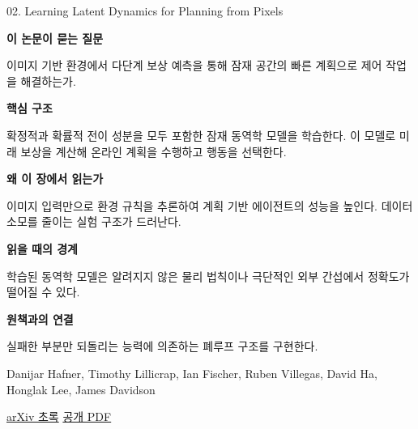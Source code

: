 \documentclass[11pt,openany]{book}
\begin{document}
\begin{termcard}{02. Learning Latent Dynamics for Planning from Pixels}

\par

\medskip

{\sffamily\bfseries\color{deepblue} 이 논문이 묻는 질문}\par

이미지 기반 환경에서 다단계 보상 예측을 통해 잠재 공간의 빠른 계획으로 제어 작업을 해결하는가.

\smallskip

{\sffamily\bfseries\color{deepblue} 핵심 구조}\par

확정적과 확률적 전이 성분을 모두 포함한 잠재 동역학 모델을 학습한다. 이 모델로 미래 보상을 계산해 온라인 계획을 수행하고 행동을 선택한다.

\smallskip

{\sffamily\bfseries\color{deepblue} 왜 이 장에서 읽는가}\par

이미지 입력만으로 환경 규칙을 추론하여 계획 기반 에이전트의 성능을 높인다. 데이터 소모를 줄이는 실험 구조가 드러난다.

\smallskip

{\sffamily\bfseries\color{coral} 읽을 때의 경계}\par

학습된 동역학 모델은 알려지지 않은 물리 법칙이나 극단적인 외부 간섭에서 정확도가 떨어질 수 있다.

\smallskip

{\sffamily\bfseries\color{teal} 원책과의 연결}\par

실패한 부분만 되돌리는 능력에 의존하는 폐루프 구조를 구현한다.

\medskip

{\footnotesize\color{muted} Danijar Hafner, Timothy Lillicrap, Ian Fischer, Ruben Villegas, David Ha, Honglak Lee, James Davidson\par

\href{https://arxiv.org/abs/1811.04551}{arXiv 초록} \quad \href{https://arxiv.org/pdf/1811.04551}{공개 PDF}\par}

\end{termcard}
\end{document}
